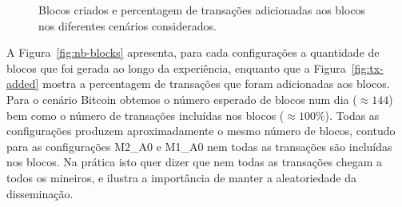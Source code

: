 \begin{figure}
\centering
{}
\caption{Blocos criados e percentagem de transações adicionadas aos blocos nos diferentes cenários considerados.}
\vspace{-0.7cm}
\end{figure}

A Figura~\ref{fig:nb-blocks} apresenta, para cada configurações a quantidade de blocos que foi gerada ao longo da experiência, enquanto que a Figura~\ref{fig:tx-added} mostra a percentagem de transações que foram adicionadas aos blocos. 
Para o cenário Bitcoin obtemos o número esperado de blocos num dia ($\approx 144$) bem como o número de transações incluídas nos blocos ($\approx 100\%$).
Todas as configurações produzem aproximadamente o mesmo número de blocos, contudo para as configurações M2\_A0 e M1\_A0 nem todas as transações são incluídas nos blocos.
Na prática isto quer dizer que nem todas as transações chegam a todos os mineiros, e ilustra a importância de manter a aleatoriedade da disseminação.


